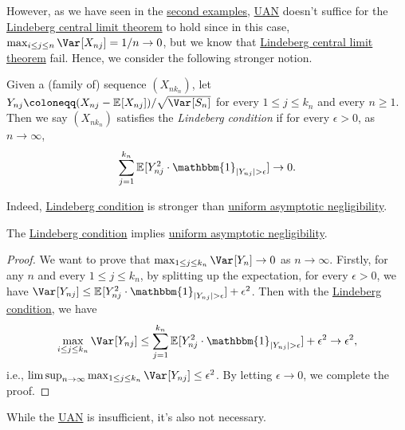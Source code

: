 However, as we have seen in the \hyperref[eg:Poisson-CLT-fail]{second examples}, \hyperref[def:uniform-asymptotic-negligibility]{UAN} doesn't suffice for the \hyperref[thm:Lindeberg-CLT]{Lindeberg central limit theorem} to hold since in this case, \(\max _{i \leq j \leq n} \Var_{}[X_{nj}] = 1 / n \to 0\), but we know that \hyperref[thm:Lindeberg-CLT]{Lindeberg central limit theorem} fail. Hence, we consider the following stronger notion.

\begin{definition}\label{def:Lindeberg-condition}
	Given a (family of) sequence \((X_{n k_n})\), let \(Y_{nj} \coloneqq (X_{nj} - \mathbb{E}_{}[X_{nj}] ) / \sqrt{\Var_{}[S_n] }\) for every \(1 \leq j \leq k_n\) and every \(n \geq 1\). Then we say \((X_{n k_n})\) satisfies the \emph{Lindeberg condition} if for every \(\epsilon > 0\), as \(n \to \infty \),
	\[
		\sum_{j=1}^{k_n} \mathbb{E}_{}[Y_{nj}^2 \cdot \mathbbm{1}_{\vert Y_{nj} \vert > \epsilon } ] \to 0.
	\]
\end{definition}

Indeed, \hyperref[def:Lindeberg-condition]{Lindeberg condition} is stronger than \hyperref[def:uniform-asymptotic-negligibility]{uniform asymptotic negligibility}.

\begin{proposition}\label{prop:Lindeberg-condition-implies-UAN}
	The \hyperref[def:Lindeberg-condition]{Lindeberg condition} implies \hyperref[def:uniform-asymptotic-negligibility]{uniform asymptotic negligibility}.
\end{proposition}
\begin{proof}
	We want to prove that \(\max _{1 \leq j \leq k_n} \Var_{}[Y_n] \to 0\) as \(n \to \infty \). Firstly, for any \(n\) and every \(1 \leq j \leq k_n\), by splitting up the expectation, for every \(\epsilon > 0\), we have \(\Var_{}[Y_{nj}] \leq \mathbb{E}_{}[Y_{nj}^2 \cdot \mathbbm{1}_{\vert Y_{nj} \vert > \epsilon } ] + \epsilon ^2\). Then with the \hyperref[def:Lindeberg-condition]{Lindeberg condition}, we have
	\[
		\max _{i \leq j \leq k_n} \Var_{}[Y_{nj}]
		\leq \sum_{j=1}^{k_n} \mathbb{E}_{}[Y_{nj}^2 \cdot \mathbbm{1}_{\vert Y_{nj} \vert > \epsilon } ] + \epsilon ^2
		\to \epsilon ^2,
	\]
	i.e., \(\limsup_{n \to \infty} \max _{1 \leq j \leq k_n} \Var_{}[Y_{nj}]  \leq \epsilon ^2\). By letting \(\epsilon \to 0\), we complete the proof.
\end{proof}

While the \hyperref[def:uniform-asymptotic-negligibility]{UAN} is insufficient, it's also not necessary.

